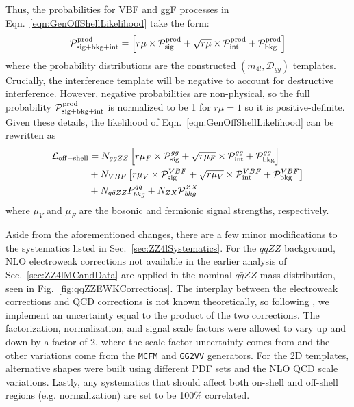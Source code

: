 Thus, the probabilities for VBF and ggF processes in Eqn.~\ref{eqn:GenOffShellLikelihood} take the form:
\begin{equation}
\mathcal{P}_{\rm sig+bkg+int}^{\rm prod} = \left[r\mu\times\mathcal{P}_{\rm sig}^{\rm prod} + \sqrt{r\mu}\times\mathcal{P}_{\rm int}^{\rm prod} + \mathcal{P}_{\rm bkg}^{\rm prod} \right]
\end{equation}
where the probability distributions are the constructed $(m_{4l},\mathcal{D}_{gg})$ templates. Crucially, the interference template will be negative to account for destructive interference. However, negative probabilities are non-physical, so the full probability $\mathcal{P}_{\rm sig+bkg+int}^{\rm prod}$ is normalized to be 1 for $r\mu=1$ so it is positive-definite. Given these details, the likelihood of Eqn.~\ref{eqn:GenOffShellLikelihood} can be rewritten as
\begin{equation}
\begin{split}
\mathcal{L}_{\rm off-shell} &= N_{ggZZ}\left[r\mu_{F}\times\mathcal{P}_{\rm sig}^{gg} + \sqrt{r\mu_{F}}\times\mathcal{P}_{\rm int}^{gg} + \mathcal{P}_{\rm bkg}^{gg}\right] \\
&+ N_{VBF}\left[r\mu_{V}\times\mathcal{P}_{\rm sig}^{VBF} + \sqrt{r\mu_{V}}\times\mathcal{P}_{\rm int}^{VBF} + \mathcal{P}_{\rm bkg}^{VBF}\right] \\
&+ N_{q\bar{q}ZZ}P_{bkg}^{q\bar{q}} + N_{ZX}\mathcal{P}_{bkg}^{ZX}
\end{split}
\end{equation}
where $\mu_V$ and $\mu_F$ are the bosonic and fermionic signal strengths, respectively.

Aside from the aforementioned changes, there are a few minor modifications to the systematics listed in Sec.~\ref{sec:ZZ4lSystematics}. For the $q\bar{q}ZZ$ background, NLO electroweak corrections \cite{Baglio:1307.4331,Bierweiler:1312,Gieseke:2014gka} not available in the earlier analysis of Sec.~\ref{sec:ZZ4lMCandData} are applied in the nominal $q\bar{q}ZZ$ mass distribution, seen in Fig.~\ref{fig:qqZZEWKCorrections}. The interplay between the electroweak corrections and QCD corrections is not known theoretically, so following \cite{kasprzikpriv}, we implement an uncertainty equal to the product of the two corrections. The factorization, normalization, and signal scale factors were allowed to vary up and down by a factor of 2, where the scale factor uncertainty comes from \cite{Passarino:2013bha} and the other variations come from the {\tt MCFM} and {\tt GG2VV} generators. For the 2D templates, alternative shapes were built using different PDF sets and the NLO QCD scale variations. Lastly, any systematics that should affect both on-shell and off-shell regions (e.g. normalization) are set to be 100\% correlated.

